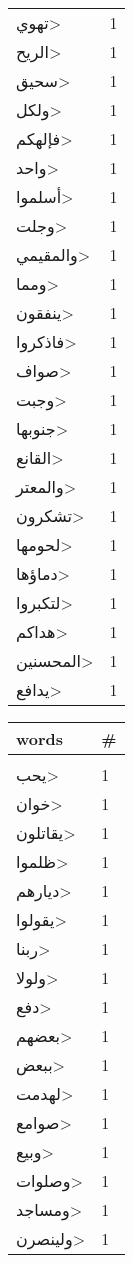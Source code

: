 \documentclass{article}
\begin{document}
\begin{multicols}{6}
\begin{center}
\begin{tabular}{ P{2cm}  P{1cm}}
\<تهوي> & 1 \\ 
\<الريح> & 1 \\ 
\<سحيق> & 1 \\ 
\<ولكل> & 1 \\ 
\<فإلهكم> & 1 \\ 
\<واحد> & 1 \\ 
\<أسلموا> & 1 \\ 
\<وجلت> & 1 \\ 
\<والمقيمي> & 1 \\ 
\<ومما> & 1 \\ 
\<ينفقون> & 1 \\ 
\<فاذكروا> & 1 \\ 
\<صواف> & 1 \\ 
\<وجبت> & 1 \\ 
\<جنوبها> & 1 \\ 
\<القانع> & 1 \\ 
\<والمعتر> & 1 \\ 
\<تشكرون> & 1 \\ 
\<لحومها> & 1 \\ 
\<دماؤها> & 1 \\ 
\<لتكبروا> & 1 \\ 
\<هداكم> & 1 \\ 
\<المحسنين> & 1 \\ 
\<يدافع> & 1 \\ 
\end{tabular} 
\begin{tabular}{ P{2cm}  P{1cm}} 
\textbf{words}    & \textbf{\#}  \\
\hline
\\[0.01cm]
\<يحب> & 1 \\ 
\<خوان> & 1 \\ 
\<يقاتلون> & 1 \\ 
\<ظلموا> & 1 \\ 
\<ديارهم> & 1 \\ 
\<يقولوا> & 1 \\ 
\<ربنا> & 1 \\ 
\<ولولا> & 1 \\ 
\<دفع> & 1 \\ 
\<بعضهم> & 1 \\ 
\<ببعض> & 1 \\ 
\<لهدمت> & 1 \\ 
\<صوامع> & 1 \\ 
\<وبيع> & 1 \\ 
\<وصلوات> & 1 \\ 
\<ومساجد> & 1 \\ 
\<ولينصرن> & 1 \\ 

\end{tabular}
\end{center}
\end{multicols}
\end{document}
